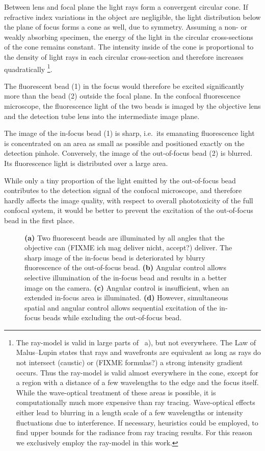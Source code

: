 Between lens and focal plane the light rays form a convergent circular
cone. If refractive index variations in the object are negligible, the
light distribution below the plane of focus forms a cone as well, due
to symmetry.  Assuming a non- or weakly absorbing specimen, the energy
of the light in the circular cross-sections of the cone remains
constant. The intensity inside of the cone is proportional to the
density of light rays in each circular cross-section and therefore
increases quadratically \footnote{The ray-model is valid in large
  parts of ~a), but not everywhere. The Law
  of Malus--Lupin states that rays and wavefronts are equivalent as
  long as rays do not intersect (caustic) or (FIXME formulas?) a
  strong intensity gradient occurs. Thus the ray-model is valid almost
  everywhere in the cone, except for a region with a distance of a few
  wavelengths to the edge and the focus itself. While the wave-optical
  treatment of these areas is possible, it is computationally much
  more expensive than ray tracing. Wave-optical effects either lead to
  blurring in a length scale of a few wavelengths or intensity
  fluctuations due to interference. If necessary, heuristics could be
  employed, to find upper bounds for the radiance from ray tracing
  results. For this reason we exclusively employ the ray-model in this
  work.}.


The fluorescent bead (1) in the focus would therefore be excited
significantly more than the bead (2) outside the focal plane. In the
confocal fluorescence microscope, the fluorescence light of the two
beads is imaged by the objective lens and the detection tube lens into
the intermediate image plane.

The image of the in-focus bead (1) is sharp, i.e.\ its emanating
fluorescence light is concentrated on an area as small as possible and
positioned exactly on the detection pinhole. Conversely, the image of
the out-of-focus bead (2) is blurred. Its fluorescence light is
distributed over a large area.

While only a tiny proportion of the light emitted by the out-of-focus
bead contributes to the detection signal of the confocal microscope,
and therefore hardly affects the image quality, with respect to
overall phototoxicity of the full confocal system, it would be better
to prevent the excitation of the out-of-focus bead in the first place.

\begin{figure}[!hbt]
  \centering
  \caption{{\bf (a)} Two fluorescent beads are illuminated by all
    angles that the objective can (FIXME ich mag deliver nicht,
    accept?) deliver. The sharp image of the in-focus bead is
    deteriorated by blurry fluorescence of the out-of-focus bead. {\bf
      (b)} Angular control allows selective illumination of the
    in-focus bead and results in a better image on the camera. {\bf
      (c)} Angular control is insufficient, when an extended in-focus
    area is illuminated. {\bf (d)} However, simultaneous spatial and
    angular control allows sequential excitation of the in-focus beads
    while excluding the out-of-focus bead.}
  \label{fig:hourglass-all}
\end{figure}

